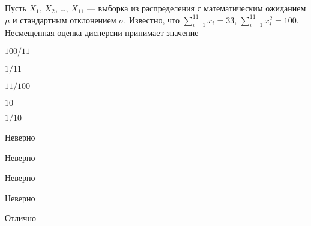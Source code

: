 
\begin{question}
Пусть \(X_1\), \(X_2\), \ldots, \(X_{11}\) — выборка из распределения
с математическим ожиданием \(\mu\) и стандартным отклонением \(\sigma\).
Известно, что \(\sum_{i=1}^{11}x_i=33\), \(\sum_{i=1}^{11}x_i^2=100\).
Несмещенная оценка дисперсии принимает значение
\begin{answerlist}
  \item \(100/11\)
  \item \(1/11\)
  \item \(11/100\)
  \item \(10\)
  \item \(1/10\)
\end{answerlist}
\end{question}

\begin{solution}
\begin{answerlist}
  \item Неверно
  \item Неверно
  \item Неверно
  \item Неверно
  \item Отлично
\end{answerlist}
\end{solution}

